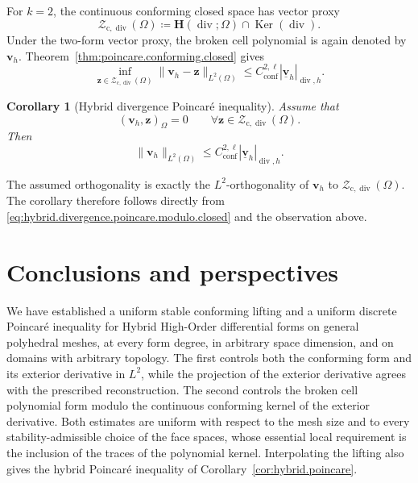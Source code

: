 \documentclass[a4paper,11pt]{article}
\newtheorem{corollary}[theorem]{Corollary}
\theoremstyle{definition}
\newcommand{\Ker}{\operatorname{Ker}}
\begin{document}
For $k=2$, the continuous conforming closed space has vector proxy
\[
  \boldsymbol{\mathcal Z}_{\mathrm c,\operatorname{div}}(\Omega)
  \coloneqq
  \boldsymbol H(\operatorname{div};\Omega)
  \cap
  \Ker(\operatorname{div}).
\]
Under the two-form vector proxy, the broken cell polynomial is again denoted by $\boldsymbol v_h$.
Theorem~\ref{thm:poincare.conforming.closed} gives
\begin{equation}
\label{eq:hybrid.divergence.poincare.modulo.closed}
  \inf_{\boldsymbol z\in
    \boldsymbol{\mathcal Z}_{\mathrm c,\operatorname{div}}(\Omega)}
  \|
    \boldsymbol v_h-\boldsymbol z
  \|_{L^2(\Omega)}
  \leq
  C_{\mathrm{conf}}^{2,\ell}
  |\underline{\boldsymbol v}_h|_{\operatorname{div},h}.
\end{equation}

\begin{corollary}[Hybrid divergence Poincar\'e inequality]
\label{cor:hybrid.divergence.poincare}
Assume that
\[
  \left(
    \boldsymbol v_h,
    \boldsymbol z
  \right)_\Omega
  =
  0
  \qquad
  \forall
  \boldsymbol z
  \in
  \boldsymbol{\mathcal Z}_{\mathrm c,\operatorname{div}}(\Omega).
\]
Then
\[
  \|\boldsymbol v_h\|_{L^2(\Omega)}
  \leq
  C_{\mathrm{conf}}^{2,\ell}
  |\underline{\boldsymbol v}_h|_{\operatorname{div},h}.
\]
\end{corollary}

The assumed orthogonality is exactly the $L^2$-orthogonality of $\boldsymbol v_h$ to $\boldsymbol{\mathcal Z}_{\mathrm c,\operatorname{div}}(\Omega)$.
The corollary therefore follows directly from \eqref{eq:hybrid.divergence.poincare.modulo.closed} and the observation above.

\section{Conclusions and perspectives}
\label{sec:conclusions}

We have established a uniform stable conforming lifting and a uniform discrete Poincar\'e inequality for Hybrid High-Order differential forms on general polyhedral meshes, at every form degree, in arbitrary space dimension, and on domains with arbitrary topology.
The first controls both the conforming form and its exterior derivative in $L^2$, while the projection of the exterior derivative agrees with the prescribed reconstruction.
The second controls the broken cell polynomial form modulo the continuous conforming kernel of the exterior derivative.
Both estimates are uniform with respect to the mesh size and to every stability-admissible choice of the face spaces, whose essential local requirement is the inclusion of the traces of the polynomial kernel.
Interpolating the lifting also gives the hybrid Poincar\'e inequality of Corollary~\ref{cor:hybrid.poincare}.
\end{document}
